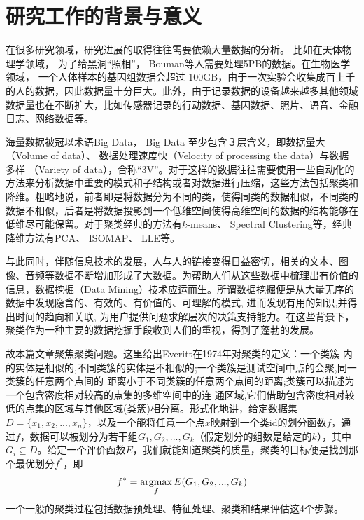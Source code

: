 \thesischapterexordium

\section{研究工作的背景与意义}

在很多研究领域，研究进展的取得往往需要依赖大量数据的分析。 比如在天体物理学领域， 为了给黑洞“照相”， Bouman等人需要处理5PB的数据。在生物医学领域， 一个人体样本的基因组数据会超过 100GB，由于一次实验会收集成百上千的人的数据，因此数据量十分巨大。此外，由于记录数据的设备越来越多其他领域数据量也在不断扩大，比如传感器记录的行动数据、基因数据、照片、语音、金融日志、网络数据等。

海量数据被冠以术语Big Data， Big Data 至少包含３层含义，即数据量大（Volume of data）、 数据处理速度快（Velocity of processing the data）与数据多样 （Variety of data），合称“3V”。对于这样的数据往往需要使用一些自动化的方法来分析数据中重要的模式和子结构或者对数据进行压缩，这些方法包括聚类和降维。粗略地说，前者即是将数据分为不同的类，使得同类的数据相似，不同类的数据不相似，后者是将数据投影到一个低维空间使得高维空间的数据的结构能够在低维尽可能保留。对于聚类经典的方法有$k$-means、 Spectral Clustering等，经典降维方法有PCA、 ISOMAP、 LLE等。

与此同时，伴随信息技术的发展，人与人的链接变得日益密切，相关的文本、图像、音频等数据不断增加形成了大数据。为帮助人们从这些数据中梳理出有价值的信息，数据挖掘（Data Mining）技术应运而生。所谓数据挖掘便是从大量无序的数据中发现隐含的、有效的、有价值的、可理解的模式, 进而发现有用的知识,并得出时间的趋向和关联, 为用户提供问题求解层次的决策支持能力。在这些背景下，聚类作为一种主要的数据挖掘手段收到人们的重视，得到了蓬勃的发展。

故本篇文章聚焦聚类问题。这里给出Everitt在1974年对聚类的定义：一个类簇
内的实体是相似的,不同类簇的实体是不相似的;一个类簇是测试空间中点的会聚,同一类簇的任意两个点间的
距离小于不同类簇的任意两个点间的距离;类簇可以描述为一个包含密度相对较高的点集的多维空间中的连
通区域,它们借助包含密度相对较低的点集的区域与其他区域(类簇)相分离。形式化地讲，给定数据集$D=\{x_1,x_2,...,x_n\}$，以及一个能将任意一个点$x$映射到一个类id的划分函数$f$，通过$f$，数据可以被划分为若干组${G_1,G_2,...,G_k}$（假定划分的组数是给定的$k$），其中$G_i \subseteq D$。给定一个评价函数$E$，我们就能知道聚类的质量，聚类的目标便是找到那个最优划分$f^*$，即
\begin{equation*}
    f^* = \operatorname*{argmax}_f E(G_1,G_2,...,G_k)
\end{equation*}
一个一般的聚类过程包括数据预处理、特征处理、聚类和结果评估这4个步骤。

